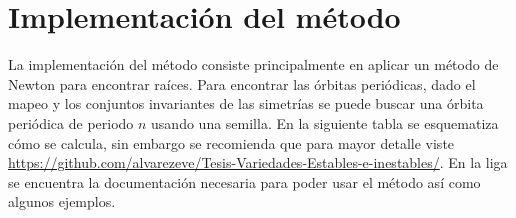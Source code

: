 \section{Implementación del método}
La implementaci\'on del m\'etodo consiste principalmente en aplicar un m\'etodo de Newton para encontrar ra\'ices. Para encontrar las \'orbitas peri\'odicas, dado el mapeo y los conjuntos invariantes de las simetr\'ias se puede buscar una \'orbita peri\'odica de periodo $n$ usando una semilla. En la siguiente tabla se esquematiza c\'omo se calcula, sin embargo se recomienda que para mayor detalle viste \url{https://github.com/alvarezeve/Tesis-Variedades-Estables-e-inestables/}.
En la liga se encuentra la documentaci\'on necesaria para poder usar el m\'etodo as\'i como algunos ejemplos. \\
\linebreak
\linebreak
\linebreak
